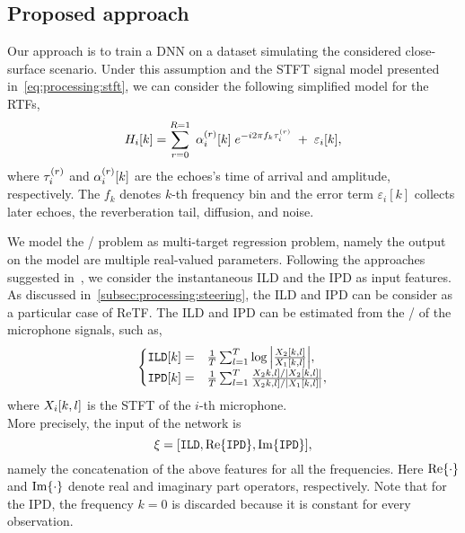 \subsection{Proposed approach}
Our approach is to train a \ac{DNN} on a dataset simulating the considered close-surface scenario.
Under this assumption and the \acf{STFT} signal model presented in~\cref{eq:processing:stft}, we can consider the following simplified model for the \acfp{RTF},
\begin{equation}\label{eq:mirage:rir}
    H_{i}[k] = \sum_{r=0}^{R=1}  \; \alpha_{i}^{(r)}[k] \; {e}^{- {i} 2 \pi f_k \tau_{i}^{(r)}} \; + \; \varepsilon_{i}[k],
\end{equation}
where $\tau_{i}^{(r)}$ and $\alpha_{i}^{(r)}[k]$ are the echoes's time of arrival and amplitude, respectively.
The $f_k$ denotes $k$-th frequency bin and the error term $\varepsilon_i[k]$ collects later echoes, the reverberation tail, diffusion, and noise.

\mynewline
We model the \AER/ problem as multi-target regression problem, namely the output on the model are multiple real-valued parameters.
Following the approaches suggested in~, we consider the instantaneous \acf{ILD} and the \ac{IPD} as input features.
As discussed in~\cref{subsec:processing:steering}, the \ac{ILD} and \ac{IPD} can be consider as a particular case of \acf{ReTF}.
The \ac{ILD} and \ac{IPD} can be estimated from the \STFT/ of the microphone signals, such as,
\begin{equation} \label{eq:mirage:features}
\begin{cases}
    \ild[k]  =& \tfrac{1}{T} \sum_{l=1}^T \log{\abs{\frac{\MIC_2[k,l]}{\MIC_1[k,l]}}}, \\
    \ipd[k]  =& \tfrac{1}{T} \sum_{l=1}^T \frac{\MIC_2k,l]/ \abs{\MIC_2[k,l]}}{ \MIC_2k,l] / \abs{\MIC_1[k,l]}},\\
\end{cases}
\end{equation}
where $X_i[k,l]$ is the \ac{STFT} of the $i$-th microphone.
\\More precisely, the input of the network is
\begin{equation*}
    \xi = \klist{ \ild, \kRe\set{\ipd}, \kIm\set{\ipd}}
    ,
\end{equation*}
namely the concatenation of the above features for all the frequencies.
Here $\kRe\set{\cdot}$ and $\kIm\set{\cdot}$ denote real and imaginary part operators, respectively.
Note that for the \ac{IPD}, the frequency $k=0$ is discarded because it is constant for every observation.

